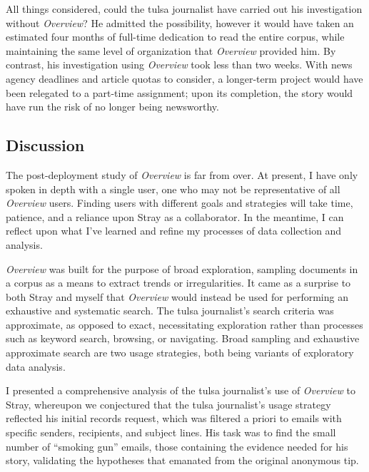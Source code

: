 All things considered, could the {\sc tulsa} journalist have carried out his investigation without {\it Overview}? 
He admitted the possibility, however it would have taken an estimated four months of full-time dedication to read the entire corpus, while maintaining the same level of organization that {\it Overview} provided him. 
By contrast, his investigation using {\it Overview} took less than two weeks. 
With news agency deadlines and article quotas to consider, a longer-term project would have been relegated to a part-time assignment; upon its completion, the story would have run the risk of no longer being newsworthy.

\subsection{Discussion}
\label{app:overview:prelim-discussion}

The post-deployment study of {\it Overview} is far from over. 
At present, I have only spoken in depth with a single user, one who may not be representative of all {\it Overview} users. 
Finding users with different goals and strategies will take time, patience, and a reliance upon Stray as a collaborator. 
In the meantime, I can reflect upon what I've learned and refine my processes of data collection and analysis.

{\it Overview} was built for the purpose of broad exploration, sampling documents in a corpus as a means to extract trends or irregularities.
It came as a surprise to both Stray and myself that {\it Overview} would instead be used for performing an exhaustive and systematic search.
The {\sc tulsa} journalist's search criteria was approximate, as opposed to exact, necessitating exploration rather than processes such as keyword search, browsing, or navigating.
Broad sampling and exhaustive approximate search are two usage strategies, both being variants of exploratory data analysis.

I presented a comprehensive analysis of the {\sc tulsa} journalist's use of {\it Overview} to Stray, whereupon we conjectured that the {\sc tulsa} journalist's usage strategy reflected his initial records request, which was filtered a priori to emails with specific senders, recipients, and subject lines. 
His task was to find the small number of ``smoking gun'' emails, those containing the evidence needed for his story, validating the hypotheses that emanated from the original anonymous tip. 

